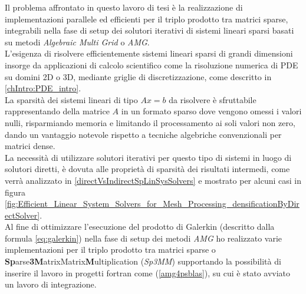 \label{abstract}

Il problema affrontato in questo lavoro di tesi è la realizzazione di implementazioni 
parallele ed efficienti per il triplo prodotto tra matrici sparse,
integrabili nella fase di setup dei solutori iterativi di sistemi lineari sparsi basati su metodi 
\emph{Algebraic Multi Grid} o \emph{AMG}.\\
L'esigenza di risolvere efficientemente sistemi lineari sparsi di grandi dimensioni 
insorge da applicazioni di calcolo scientifico come la risoluzione numerica di PDE su domini 2D o 3D, 
mediante griglie di discretizzazione, come descritto in \ref{chIntro:PDE_intro}.\\
La sparsità dei sistemi lineari di tipo $Ax=b$ da risolvere è sfruttabile rappresentando 
della matrice $A$ in un formato sparso dove vengono omessi i valori nulli,
risparmiando memoria e limitando il processamento ai soli valori non zero,
dando un vantaggio notevole rispetto a tecniche algebriche convenzionali per matrici dense.\\
La necessità di utilizzare solutori iterativi per questo tipo di sistemi in luogo di solutori diretti,
è dovuta alle proprietà di sparsità dei risultati intermedi, come verrà analizzato in \ref{directVsIndirectSpLinSysSolvers}
e mostrato per alcuni casi in figura \ref{fig:Efficient_Linear_System_Solvers_for_Mesh_Processing_densificationByDirectSolver}.\\
%
Al fine di ottimizzare l'esecuzione del prodotto di Galerkin (descritto dalla formula \ref{eq:galerkin}) nella fase di setup 
dei metodi \emph{AMG} ho realizzato varie implementazioni per 
il triplo prodotto tra matrici sparse o {\bf{Sp}}arse{\bf{3}}{\bf{M}}atrixMatrix{\bf{M}}ultiplication (\emph{Sp3MM})
supportando la possibilità di inserire il lavoro in progetti fortran come  (\ref{amg4psblas}),
su cui è stato avviato un lavoro di integrazione.

